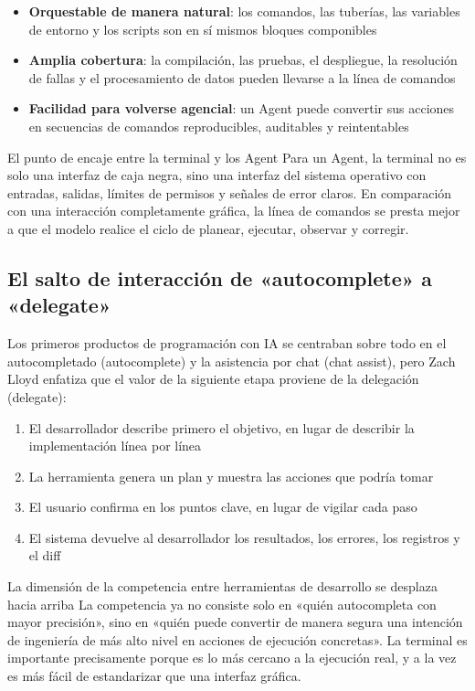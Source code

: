 \documentclass[a4paper]{article}
\begin{document}
\begin{itemize}
    \item \textbf{Orquestable de manera natural}: los comandos, las tuberías, las variables de entorno y los scripts son en sí mismos bloques componibles
    \item \textbf{Amplia cobertura}: la compilación, las pruebas, el despliegue, la resolución de fallas y el procesamiento de datos pueden llevarse a la línea de comandos
    \item \textbf{Facilidad para volverse agencial}: un Agent puede convertir sus acciones en secuencias de comandos reproducibles, auditables y reintentables
\end{itemize}

\begin{knowledgebox}{El punto de encaje entre la terminal y los Agent}
Para un Agent, la terminal no es solo una interfaz de caja negra, sino una interfaz del sistema operativo con entradas, salidas, límites de permisos y señales de error claros. En comparación con una interacción completamente gráfica, la línea de comandos se presta mejor a que el modelo realice el ciclo de planear, ejecutar, observar y corregir.
\end{knowledgebox}

\subsection{El salto de interacción de «autocomplete» a «delegate»}

Los primeros productos de programación con IA se centraban sobre todo en el autocompletado (autocomplete) y la asistencia por chat (chat assist), pero Zach Lloyd enfatiza que el valor de la siguiente etapa proviene de la delegación (delegate):

\begin{enumerate}
    \item El desarrollador describe primero el objetivo, en lugar de describir la implementación línea por línea
    \item La herramienta genera un plan y muestra las acciones que podría tomar
    \item El usuario confirma en los puntos clave, en lugar de vigilar cada paso
    \item El sistema devuelve al desarrollador los resultados, los errores, los registros y el diff
\end{enumerate}

\begin{importantbox}{La dimensión de la competencia entre herramientas de desarrollo se desplaza hacia arriba}
La competencia ya no consiste solo en «quién autocompleta con mayor precisión», sino en «quién puede convertir de manera segura una intención de ingeniería de más alto nivel en acciones de ejecución concretas». La terminal es importante precisamente porque es lo más cercano a la ejecución real, y a la vez es más fácil de estandarizar que una interfaz gráfica.
\end{importantbox}
\end{document}
